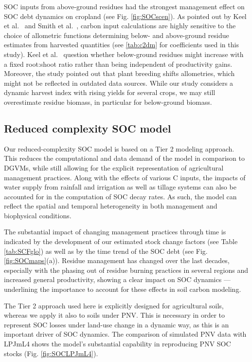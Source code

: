 \documentclass[gc, manuscript]{copernicus}
\begin{document}
SOC inputs from above-ground residues had the strongest management effect on SOC debt dynamics on cropland (see Fig. \ref{fig:SOCscen}). As pointed out by Keel et al.~\citeyearpar{keel_large_2017} and Smith et al.~\citeyearpar{smith_how_2020}, carbon input calculations are highly sensitive to the choice of allometric functions determining below- and above-ground residue estimates from harvested quantities (see \ref{tab:c2dm} for coefficients used in this study). Keel et al.~\citeyearpar{keel_large_2017} question whether below-ground residues might increase with a fixed root:shoot ratio rather than being independent of productivity gains. Moreover, the study pointed out that plant breeding shifts allometries, which might not be reflected in outdated data sources. While our study considers a dynamic harvest index with rising yields for several crops, we may still overestimate residue biomass, in particular for below-ground biomass.

\hypertarget{reduced-complexity-soc-model}{%
\subsection{Reduced complexity SOC model}\label{reduced-complexity-soc-model}}

Our reduced-complexity SOC model is based on a Tier 2 modeling approach. This reduces the computational and data demand of the model in comparison to DGVMs, while still allowing for the explicit representation of agricultural management practices. Along with the effects of various C inputs, the impacts of water supply from rainfall and irrigation as well as tillage systems can also be accounted for in the computation of SOC decay rates. As such, the model can reflect the spatial and temporal heterogeneity in both management and biophysical conditions.

The substantial impact of changing management practices through time is indicated by the development of our estimated stock change factors (see Table \ref{tab:SCFglo}) as well as by the time trend of the SOC debt (see Fig. \ref{fig:SOCmaps}(a)). Residue management has changed over the last decades, especially with the phasing out of residue burning practices in several regions and increased general productivity, showing a clear impact on SOC dynamics --- underlining the importance to account for these effects in soil carbon modeling.

The Tier 2 approach \citep{ogle_cropland_in_ipcc_2019} used here is explicitly designed for agricultural soils, whereas we apply it also to soils under PNV. This is necessary in order to represent SOC losses under land-use change in a dynamic way, as this is an important driver of SOC dynamics. The comparison of simulated PNV data with LPJmL4 shows the model's substantial capability in reproducing PNV SOC stocks (Fig. \ref{fig:SOCLPJmL4}).
\end{document}
